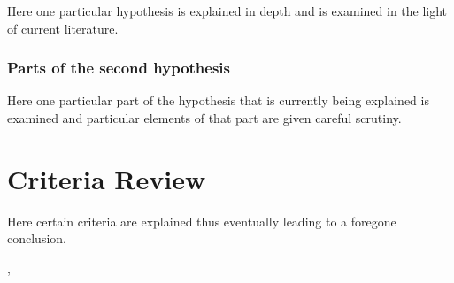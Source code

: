 Here one particular hypothesis is explained in depth
and is examined in the light of current literature.

\subsubsection{Parts of the second hypothesis}

Here one particular part of the hypothesis that is
currently being explained is examined and particular
elements of that part are given careful scrutiny.

\section{Criteria Review}

Here certain criteria are explained thus eventually
leading to a foregone conclusion.

\autocite{correaValadierlikeFormulasSupremum},\autocite{kleeHellyTheoremIts1963}
